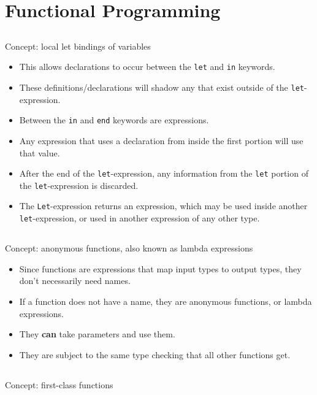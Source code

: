 \section{Functional Programming}\label{sec:Functional_Programming}

\subsection{}
Concept: local let bindings of variables

\begin{itemize}[noitemsep]
\item This allows declarations to occur between the \texttt{let} and \texttt{in} keywords.
\item These definitions/declarations will shadow any that exist outside of the \texttt{let}-expression.
\item Between the \texttt{in} and \texttt{end} keywords are expressions.
\item Any expression that uses a  declaration from inside the first portion will use that value.
\item After the end of the \texttt{let}-expression, any information from the \texttt{let} portion of the \texttt{let}-expression is discarded.
\item The \texttt{Let}-expression returns an expression, which may be used inside another \texttt{let}-expression, or used in another expression of any other type.
\end{itemize}

\subsection{}
Concept: anonymous functions, also known as lambda expressions

\begin{itemize}[noitemsep]
\item Since functions are expressions that map input types to output types, they don't necessarily need names.
\item If a function does not have a name, they are anonymous functions, or lambda expressions.
\item They \textbf{can} take parameters and use them.
\item They are subject to the same type checking that all other functions get.
\end{itemize}

\subsection{}
Concept: first-class functions

